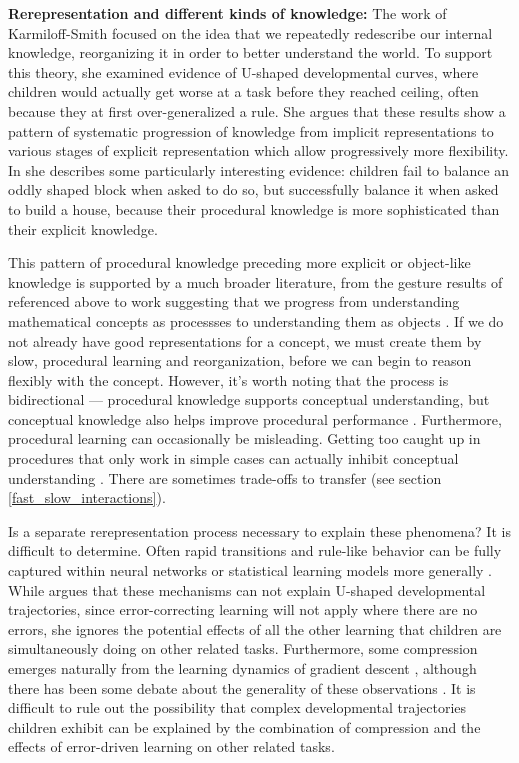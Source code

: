 \textbf{Rerepresentation and different kinds of knowledge:} The work of Karmiloff-Smith \citep[e.g.][]{Karmiloff-Smith1986, Karmiloff-Smith1992, Clark1993} focused on the idea that we repeatedly redescribe our internal knowledge, reorganizing it in order to better understand the world. To support this theory, she examined evidence of U-shaped developmental curves, where children would actually get worse at a task before they reached ceiling, often because they at first over-generalized a rule. She argues that these results show a pattern of systematic progression of knowledge from implicit representations to various stages of explicit representation which allow progressively more flexibility. In \citet{Karmiloff-Smith1986} she describes some particularly interesting evidence: children fail to balance an oddly shaped block when asked to do so, but successfully balance it when asked to build a house, because their procedural knowledge is more sophisticated than their explicit knowledge. \par 
This pattern of procedural knowledge preceding more explicit or object-like knowledge is supported by a much broader literature, from the gesture results of \citet{Goldin-Meadow1993} referenced above to work suggesting that we progress from understanding mathematical concepts as processses to understanding them as objects \citep{Dubinsky1991, Hazzan1999}. If we do not already have good representations for a concept, we must create them by slow, procedural learning and reorganization, before we can begin to reason flexibly with the concept. However, it's worth noting that the process is bidirectional --- procedural knowledge supports conceptual understanding, but conceptual knowledge also helps improve procedural performance \citep{Rittle-Johnson2001}. Furthermore, procedural learning can occasionally be misleading. Getting too caught up in procedures that only work in simple cases can actually inhibit conceptual understanding \citep{McNeil2005}. There are sometimes trade-offs to transfer (see section \ref{fast_slow_interactions}). \par 
Is a separate rerepresentation process necessary to explain these phenomena? It is difficult to determine. Often rapid transitions and rule-like behavior can be fully captured within neural networks or statistical learning models more generally \citep[e.g.][]{McClelland1999, McClelland2002, Schapiro2009, Aslin2012}. While \citet{Karmiloff-Smith1992} argues that these mechanisms can not explain U-shaped developmental trajectories, since error-correcting learning will not apply where there are no errors, she ignores the potential effects of all the other learning that children are simultaneously doing on other related tasks. Furthermore, some compression emerges naturally from the learning dynamics of gradient descent \citep{Tishby2015, Shwartz-Ziv2017, Achille2017}, although there has been some debate about the generality of these observations \citep[e.g.][]{Saxe2018a}. It is difficult to rule out the possibility that complex developmental trajectories children exhibit can be explained by the combination of compression and the effects of error-driven learning on other related tasks. \par
